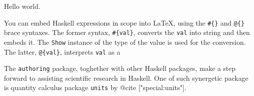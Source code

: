 \documentclass[natbib]{article}
\begin{document}
Hello world.


You can embed Haskell expressions in scope into LaTeX, using
the {\tt \#\{\}}
and
{\tt @\{\}}  brace syntaxes.
The former syntax,
 {\tt \#\{val\}}, converts the {\tt val} into string
and then embeds it. The {\tt Show} instance of the type of the value is 
used for the conversion.
The latter,  {\tt @\{val\}}, interprets {\tt val} as a

The {\tt authoring} package, toghether with other Haskell packages,
make a step forward to assisting scientific research in Haskell.
One of such synergetic package is 
quantity calculus package {\tt units} by
@{cite ["special:units"]}.



\end{document}
